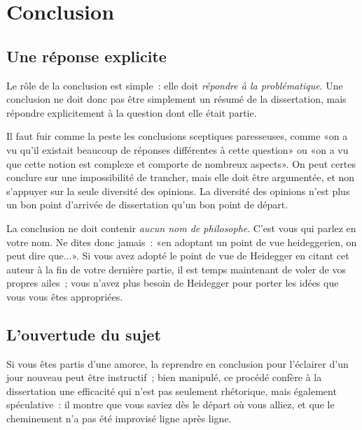 \documentclass[a4paper,11pt]{article}
\begin{document}
\section{Conclusion}

\subsection{Une réponse explicite}

Le rôle de la conclusion est simple~: elle doit \emph{répondre à la
  problématique}. Une conclusion ne doit donc pas être simplement un
résumé de la dissertation, mais répondre explicitement à la question
dont elle était partie.

\par

Il faut fuir comme la peste les conclusions sceptiques paresseuses,
comme «on a vu qu'il existait beaucoup de réponses différentes à cette
question» ou «on a vu que cette notion est complexe et comporte de
nombreux aspects». On peut certes conclure sur une impossibilité de
trancher, mais elle doit être argumentée, et non s'appuyer sur la seule
diversité des opinions. La diversité des opinions n'est plus un bon
point d'arrivée de dissertation qu'un bon point de départ.

\par

La conclusion ne doit contenir \emph{aucun nom de philosophe}. C'est
vous qui parlez en votre nom. Ne dites donc jamais~: «en adoptant un
point de vue heideggerien, on peut dire que...». Si vous avez adopté le
point de vue de Heidegger en citant cet auteur à la fin de votre
dernière partie, il est temps maintenant de voler de vos propres ailes~;
vous n'avez plus besoin de Heidegger pour porter les idées que vous vous
êtes appropriées.



\subsection{L'ouvertude du sujet}

Si vous êtes partis d'une amorce, la reprendre en conclusion pour
l'éclairer d'un jour nouveau peut être instructif~; bien manipulé, ce
procédé confère à la dissertation une efficacité qui n'est pas seulement
rhétorique, mais également spéculative~: il montre que vous saviez dès
le départ où vous alliez, et que le cheminement n'a pas été improvisé
ligne après ligne.

\par
\end{document}
